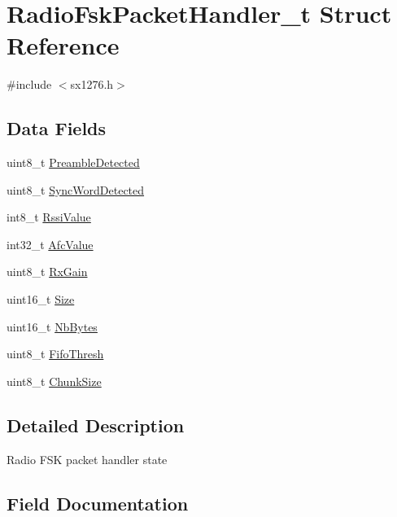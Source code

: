 \hypertarget{structRadioFskPacketHandler__t}{}\section{Radio\+Fsk\+Packet\+Handler\+\_\+t Struct Reference}
\label{structRadioFskPacketHandler__t}


{\ttfamily \#include $<$sx1276.\+h$>$}

\subsection*{Data Fields}
\begin{DoxyCompactItemize}
\item 
uint8\+\_\+t \hyperlink{structRadioFskPacketHandler__t_a97c923759975964c814a1242a9066cf4}{Preamble\+Detected}
\item 
uint8\+\_\+t \hyperlink{structRadioFskPacketHandler__t_aeaa0cefa4c67703953b8cf9ee2bf74cc}{Sync\+Word\+Detected}
\item 
int8\+\_\+t \hyperlink{structRadioFskPacketHandler__t_ac8c8c5d7a472439647c7191bdc08d018}{Rssi\+Value}
\item 
int32\+\_\+t \hyperlink{structRadioFskPacketHandler__t_ae4ba7d5bae19bb4e544986c6f518a583}{Afc\+Value}
\item 
uint8\+\_\+t \hyperlink{structRadioFskPacketHandler__t_a88f8201830b4db2d710542057a9697f6}{Rx\+Gain}
\item 
uint16\+\_\+t \hyperlink{structRadioFskPacketHandler__t_ada3d579022ff861f2039bf506a5b9ca2}{Size}
\item 
uint16\+\_\+t \hyperlink{structRadioFskPacketHandler__t_abc3c832c34dcbc8511aab189c2e752f1}{Nb\+Bytes}
\item 
uint8\+\_\+t \hyperlink{structRadioFskPacketHandler__t_aa5d2d8ab8dd126a3d46bddfc1cf2df92}{Fifo\+Thresh}
\item 
uint8\+\_\+t \hyperlink{structRadioFskPacketHandler__t_ade09fc9f108fa6ff8cfc3180d9094cb8}{Chunk\+Size}
\end{DoxyCompactItemize}


\subsection{Detailed Description}
Radio F\+SK packet handler state 

\subsection{Field Documentation}
\mbox{\label{structRadioFskPacketHandler__t_ae4ba7d5bae19bb4e544986c6f518a583}} 
